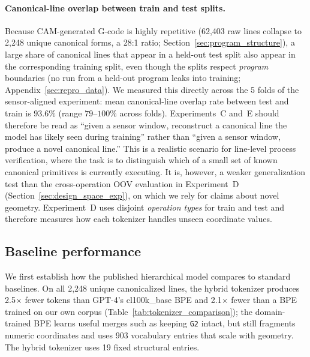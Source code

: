 \documentclass[sensors,article,submit,moreauthors,pdftex]{Definitions/mdpi}
\begin{document}
\paragraph{Canonical-line overlap between train and test splits.}
Because CAM-generated G-code is highly repetitive (62{,}403 raw lines collapse to 2{,}248 unique canonical forms, a 28:1 ratio; Section~\ref{sec:program_structure}), a large share of canonical lines that appear in a held-out test split also appear in the corresponding training split, even though the splits respect \emph{program} boundaries (no run from a held-out program leaks into training; Appendix~\ref{sec:repro_data}). We measured this directly across the 5 folds of the sensor-aligned experiment: mean canonical-line overlap rate between test and train is $93.6\%$ (range $79$--$100\%$ across folds). Experiments~C and~E should therefore be read as ``given a sensor window, reconstruct a canonical line the model has likely seen during training'' rather than ``given a sensor window, produce a novel canonical line.'' This is a realistic scenario for line-level process verification, where the task is to distinguish which of a small set of known canonical primitives is currently executing. It is, however, a weaker generalization test than the cross-operation OOV evaluation in Experiment~D (Section~\ref{sec:design_space_exp}), on which we rely for claims about novel geometry. Experiment~D uses disjoint \emph{operation types} for train and test and therefore measures how each tokenizer handles unseen coordinate values.

\subsection{Baseline performance}
\label{sec:baseline_performance}

We first establish how the published hierarchical model compares to standard baselines. On all 2{,}248 unique canonicalized lines, the hybrid tokenizer produces 2.5$\times$ fewer tokens than GPT-4's cl100k\_base BPE and 2.1$\times$ fewer than a BPE trained on our own corpus (Table~\ref{tab:tokenizer_comparison}); the domain-trained BPE learns useful merges such as keeping \texttt{G2} intact, but still fragments numeric coordinates and uses 903 vocabulary entries that scale with geometry. The hybrid tokenizer uses 19 fixed structural entries.
\end{document}

